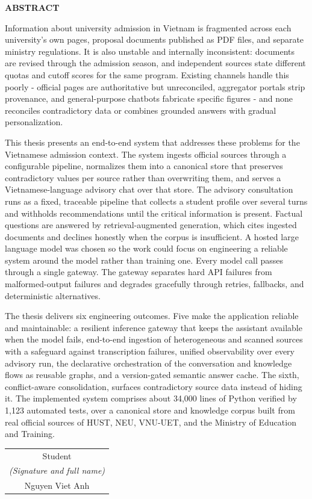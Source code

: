 \documentclass[../main.tex]{subfiles}
\begin{document}
\begin{center}
    \Large{\textbf{ABSTRACT}}\\
\end{center}
\vspace{1cm}

Information about university admission in Vietnam is fragmented across each university's own pages, proposal documents published as \gls{PDF} files, and separate ministry regulations.
It is also unstable and internally inconsistent: documents are revised through the admission season, and independent sources state different quotas and cutoff scores for the same program.
Existing channels handle this poorly - official pages are authoritative but unreconciled, aggregator portals strip provenance, and general-purpose chatbots fabricate specific figures - and none reconciles contradictory data or combines grounded answers with gradual personalization.

This thesis presents an end-to-end system that addresses these problems for the Vietnamese admission context.
The system ingests official sources through a configurable pipeline, normalizes them into a canonical store that preserves contradictory values per source rather than overwriting them, and serves a Vietnamese-language advisory chat over that store.
The advisory consultation runs as a fixed, traceable pipeline that collects a student profile over several turns and withholds recommendations until the critical information is present.
Factual questions are answered by retrieval-augmented generation, which cites ingested documents and declines honestly when the corpus is insufficient.
A hosted large language model was chosen so the work could focus on engineering a reliable system around the model rather than training one.
Every model call passes through a single gateway.
The gateway separates hard \gls{API} failures from malformed-output failures and degrades gracefully through retries, fallbacks, and deterministic alternatives.

The thesis delivers six engineering outcomes.
Five make the application reliable and maintainable: a resilient inference gateway that keeps the assistant available when the model fails, end-to-end ingestion of heterogeneous and scanned sources with a safeguard against transcription failures, unified observability over every advisory run, the declarative orchestration of the conversation and knowledge flows as reusable graphs, and a version-gated semantic answer cache.
The sixth, conflict-aware consolidation, surfaces contradictory source data instead of hiding it.
The implemented system comprises about 34{,}000 lines of Python verified by 1{,}123 automated tests, over a canonical store and knowledge corpus built from real official sources of HUST, NEU, VNU-UET, and the Ministry of Education and Training.

\begin{flushright}
\begin{tabular}{@{}c@{}}
Student\\
\textit{(Signature and full name)}\\[1cm]
Nguyen Viet Anh
\end{tabular}
\end{flushright}
\end{document}
